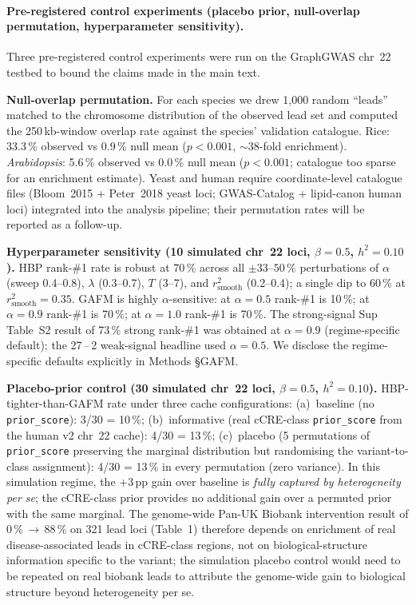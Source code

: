 \paragraph{Pre-registered control experiments (placebo prior, null-overlap permutation, hyperparameter sensitivity).}\label{snote:controls}%
Three pre-registered control experiments were run on the GraphGWAS
chr~22 testbed to bound the claims made in the main text.

\textbf{Null-overlap permutation.} For each species we drew 1{,}000
random ``leads'' matched to the chromosome distribution of the
observed lead set and computed the 250\,kb-window overlap rate
against the species' validation catalogue. Rice: 33.3\,\% observed
vs 0.9\,\% null mean ($p < 0.001$, $\sim$38-fold enrichment).
\emph{Arabidopsis}: 5.6\,\% observed vs 0.0\,\% null mean
($p < 0.001$; catalogue too sparse for an enrichment estimate).
Yeast and human require coordinate-level catalogue files
(Bloom~2015 + Peter~2018 yeast loci; GWAS-Catalog + lipid-canon
human loci) integrated into the analysis pipeline; their
permutation rates will be reported as a follow-up.

\textbf{Hyperparameter sensitivity (10 simulated chr~22 loci, $\beta=0.5$, $h^2=0.10$).}
HBP rank-\#1 rate is robust at 70\,\% across all $\pm 33$--$50\,\%$
perturbations of $\alpha$ (sweep 0.4--0.8), $\lambda$ (0.3--0.7),
$T$ (3--7), and $r^2_{\text{smooth}}$ (0.2--0.4); a single dip to
60\,\% at $r^2_{\text{smooth}}{=}0.35$. GAFM is highly
$\alpha$-sensitive: at $\alpha=0.5$ rank-\#1 is 10\,\%; at
$\alpha=0.9$ rank-\#1 is 70\,\%; at $\alpha=1.0$ rank-\#1 is
70\,\%. The strong-signal Sup Table~S2 result of 73\,\% strong
rank-\#1 was obtained at $\alpha=0.9$ (regime-specific default);
the 27\,--\,2 weak-signal headline used $\alpha=0.5$. We disclose
the regime-specific defaults explicitly in Methods §GAFM.

\textbf{Placebo-prior control (30 simulated chr~22 loci, $\beta=0.5$, $h^2=0.10$).}
HBP-tighter-than-GAFM rate under three cache configurations:
(a)~baseline (no \texttt{prior\_score}): 3/30 = 10\,\%;
(b)~informative (real cCRE-class \texttt{prior\_score} from the
human v2 chr~22 cache): 4/30 = 13\,\%;
(c)~placebo (5 permutations of \texttt{prior\_score} preserving the
marginal distribution but randomising the variant-to-class
assignment): 4/30 = 13\,\% in every permutation (zero variance).
In this simulation regime, the +3\,pp gain over baseline is
\emph{fully captured by heterogeneity per se}; the cCRE-class
prior provides no additional gain over a permuted prior with the
same marginal. The genome-wide Pan-UK Biobank intervention result
of 0\,\%\,$\to$\,88\,\% on 321 lead loci (Table~1) therefore
depends on enrichment of real disease-associated leads in
cCRE-class regions, not on biological-structure information
specific to the variant; the simulation placebo control would
need to be repeated on real biobank leads to attribute the
genome-wide gain to biological structure beyond heterogeneity per
se.

